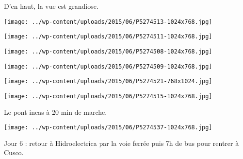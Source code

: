 D'en haut, la vue est grandiose.
\begin{center} \texttt{[image: ../wp-content/uploads/2015/06/P5274513-1024x768.jpg]} \end{center}
\begin{center} \texttt{[image: ../wp-content/uploads/2015/06/P5274511-1024x768.jpg]} \end{center}

\begin{center} \texttt{[image: ../wp-content/uploads/2015/06/P5274508-1024x768.jpg]} \end{center}
\begin{center} \texttt{[image: ../wp-content/uploads/2015/06/P5274509-1024x768.jpg]} \end{center}

\begin{center} \texttt{[image: ../wp-content/uploads/2015/06/P5274521-768x1024.jpg]} \end{center}
\begin{center} \texttt{[image: ../wp-content/uploads/2015/06/P5274515-1024x768.jpg]} \end{center}
\pagebreak

Le pont incas à 20 min de marche. 
\begin{center} \texttt{[image: ../wp-content/uploads/2015/06/P5274537-1024x768.jpg]} \end{center}

Jour 6 : retour à Hidroelectrica par la voie ferrée puis 7h de bus pour rentrer à Cusco.
